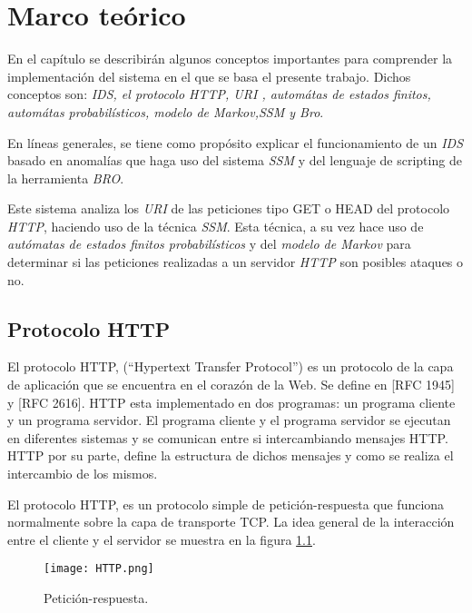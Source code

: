 \chapter{Marco teórico}
\label{capitulo2}


En el cap\'itulo se describir\'an algunos conceptos importantes para comprender la implementaci\'on del sistema  en el que se basa el presente trabajo. Dichos conceptos son: \textit{IDS, el protocolo HTTP, URI , autom\'atas de estados finitos, autom\'atas probabilísticos, modelo de Markov,SSM y Bro}.

En l\'ineas generales, se tiene como prop\'osito explicar el funcionamiento de un \textit{IDS} basado en anomalías que haga uso del sistema \textit{SSM} y del lenguaje de scripting de la herramienta \textit{BRO}.

Este sistema analiza los \textit{URI} de las peticiones tipo GET o HEAD del protocolo \textit{HTTP}, haciendo uso de la t\'ecnica \textit{SSM}. Esta t\'ecnica, a su vez hace uso de \textit{autómatas de estados finitos probabilísticos} y del \textit{modelo de Markov} para determinar si las peticiones realizadas a un servidor \textit{HTTP} son posibles ataques o no.

\section{Protocolo HTTP}

El protocolo HTTP, (``Hypertext Transfer Protocol'') es un protocolo de la capa de aplicación que se encuentra en el corazón de la Web. Se define en [RFC 1945] y [RFC 2616]. HTTP esta implementado en dos programas: un programa cliente y un programa servidor. El programa cliente y el programa servidor se ejecutan en diferentes sistemas y se comunican entre si intercambiando mensajes HTTP. HTTP por su parte, define la estructura de dichos mensajes y como se realiza el intercambio de los mismos. \cite{httpKross}

El protocolo HTTP, es un protocolo simple de petición-respuesta que funciona normalmente sobre la capa de transporte TCP. La idea general de la interacción entre el cliente y el servidor se muestra en la figura \ref{fig:httpPeticionRespuesta}. 

\begin{figure}[tb]
\begin{center}
\texttt{[image: HTTP.png]}
\caption{Petición-respuesta.\cite{httpKross}}
\label{fig:httpPeticionRespuesta}
\end{center}
\end{figure}

